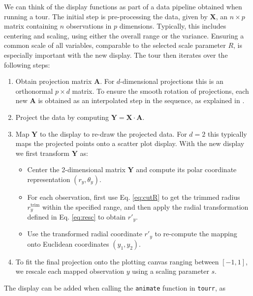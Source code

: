 \documentclass[]{interact}
\theoremstyle{plain}%
\theoremstyle{definition}
\theoremstyle{remark}
\def\tightlist{}
\begin{document}
We can think of the display functions as part of a data pipeline
obtained when running a tour. The initial step is pre-processing the
data, given by \(\mathbf{X}\), an \(n \times p\) matrix containing \(n\)
observations in \(p\) dimensions. Typically, this includes centering and
scaling, using either the overall range or the variance. Ensuring a
common scale of all variables, comparable to the selected scale
parameter \(R\), is especially important with the new display. The tour
then iterates over the following steps:

\begin{enumerate}
\def\labelenumi{\arabic{enumi}.}
\tightlist
\item
  Obtain projection matrix \(\mathbf{A}\). For \(d\)-dimensional
  projections this is an orthonormal \(p \times d\) matrix. To ensure
  the smooth rotation of projections, each new \(\mathbf{A}\) is
  obtained as an interpolated step in the sequence, as explained in
  \citet{BCAH05}.
\item
  Project the data by computing
  \(\mathbf{Y} = \mathbf{X}\cdot\mathbf{A}\).
\item
  Map \(\mathbf{Y}\) to the display to re-draw the projected data. For
  \(d=2\) this typically maps the projected points onto a scatter plot
  display. With the new display we first transform \(\mathbf{Y}\) as:

  \begin{itemize}
  \tightlist
  \item
    Center the 2-dimensional matrix \(\mathbf{Y}\) and compute its polar
    coordinate representation \((r_y, \theta_y)\).
  \item
    For each observation, first use Eq. \ref{eq:cutR} to get the trimmed
    radius \(r_y^{\mathrm{trim}}\) within the specified range, and then
    apply the radial transformation defined in Eq. \ref{eq:resc} to
    obtain \(r'_y\).
  \item
    Use the transformed radial coordinate \(r'_y\) to re-compute the
    mapping onto Euclidean coordinates \((y_1, y_2)\).
  \end{itemize}
\item
  To fit the final projection onto the plotting canvas ranging between
  \([-1,1]\), we rescale each mapped observation \(y\) using a scaling
  parameter \(s\).
\end{enumerate}

The display can be added when calling the \texttt{animate} function in
\texttt{tourr}, as
\end{document}
